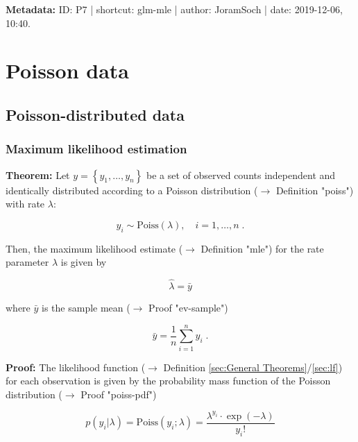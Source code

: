\documentclass[a4paper,12pt]{book}
\begin{document}
\vspace{1em}
\textbf{Metadata:} ID: P7 | shortcut: glm-mle | author: JoramSoch | date: 2019-12-06, 10:40.


\pagebreak
\section{Poisson data}

\subsection{Poisson-distributed data}

\subsubsection[\textbf{Maximum likelihood estimation}]{Maximum likelihood estimation} \label{sec:poiss-mle}

\vspace{1em}
\textbf{Theorem:} Let $y = \left\lbrace y_1, \ldots, y_n \right\rbrace$ be a set of observed counts independent and identically distributed according to a Poisson distribution ($\rightarrow$ Definition "poiss") with rate $\lambda$:

\begin{equation} \label{eq:poiss-mle-Poiss}
y_i \sim \mathrm{Poiss}(\lambda), \quad i = 1, \ldots, n \; .
\end{equation}

Then, the maximum likelihood estimate ($\rightarrow$ Definition "mle") for the rate parameter $\lambda$ is given by

\begin{equation} \label{eq:poiss-mle-Poiss-MLE}
\hat{\lambda} = \bar{y}
\end{equation}

where $\bar{y}$ is the sample mean ($\rightarrow$ Proof "ev-sample")

\begin{equation} \label{eq:poiss-mle-y-mean}
\bar{y} = \frac{1}{n} \sum_{i=1}^n y_i \; .
\end{equation}


\vspace{1em}
\textbf{Proof:} The likelihood function ($\rightarrow$ Definition \ref{sec:General Theorems}/\ref{sec:lf}) for each observation is given by the probability mass function of the Poisson distribution ($\rightarrow$ Proof "poiss-pdf")

\begin{equation} \label{eq:poiss-mle-Poiss-yi}
p(y_i|\lambda) = \mathrm{Poiss}(y_i; \lambda) = \frac{\lambda^{y_i} \cdot \exp(-\lambda)}{y_i !}
\end{equation}
\end{document}
